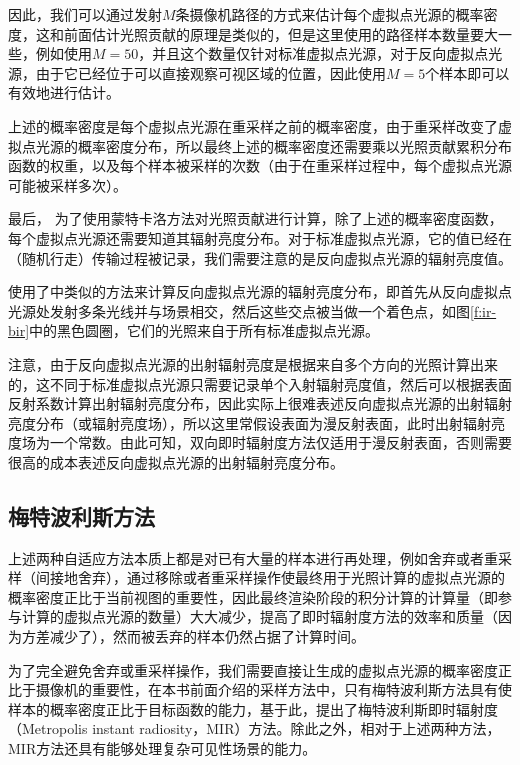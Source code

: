 因此，我们可以通过发射$M$条摄像机路径的方式来估计每个虚拟点光源的概率密度，这和前面估计光照贡献的原理是类似的，但是这里使用的路径样本数量要大一些，例如\cite{a:BidirectionalInstantRadiosity}使用$M=50$，并且这个数量仅针对标准虚拟点光源，对于反向虚拟点光源，由于它已经位于可以直接观察可视区域的位置，因此使用$M=5$个样本即可以有效地进行估计。

上述的概率密度是每个虚拟点光源在重采样之前的概率密度，由于重采样改变了虚拟点光源的概率密度分布，所以最终上述的概率密度还需要乘以光照贡献累积分布函数的权重，以及每个样本被采样的次数（由于在重采样过程中，每个虚拟点光源可能被采样多次）。

最后， 为了使用蒙特卡洛方法对光照贡献进行计算，除了上述的概率密度函数，每个虚拟点光源还需要知道其辐射亮度分布。对于标准虚拟点光源，它的值已经在（随机行走）传输过程被记录，我们需要注意的是反向虚拟点光源的辐射亮度值。

\cite{a:BidirectionalInstantRadiosity}使用了\cite{a:IlluminationinthePresenceofWeakSingularities}中类似的方法来计算反向虚拟点光源的辐射亮度分布，即首先从反向虚拟点光源处发射多条光线并与场景相交，然后这些交点被当做一个着色点，如图\ref{f:ir-bir}中的黑色圆圈，它们的光照来自于所有标准虚拟点光源。

注意，由于反向虚拟点光源的出射辐射亮度是根据来自多个方向的光照计算出来的，这不同于标准虚拟点光源只需要记录单个入射辐射亮度值，然后可以根据表面反射系数计算出射辐射亮度分布，因此实际上很难表述反向虚拟点光源的出射辐射亮度分布（或辐射亮度场），所以这里常假设表面为漫反射表面，此时出射辐射亮度场为一个常数。由此可知，双向即时辐射度方法仅适用于漫反射表面，否则需要很高的成本表述反向虚拟点光源的出射辐射亮度分布。




\subsection{梅特波利斯方法}\label{sec:ir-mir}
上述两种自适应方法本质上都是对已有大量的样本进行再处理，例如舍弃或者重采样（间接地舍弃），通过移除或者重采样操作使最终用于光照计算的虚拟点光源的概率密度正比于当前视图的重要性，因此最终渲染阶段的积分计算的计算量（即参与计算的虚拟点光源的数量）大大减少，提高了即时辐射度方法的效率和质量（因为方差减少了），然而被丢弃的样本仍然占据了计算时间。

为了完全避免舍弃或重采样操作，我们需要直接让生成的虚拟点光源的概率密度正比于摄像机的重要性，在本书前面介绍的采样方法中，只有梅特波利斯方法具有使样本的概率密度正比于目标函数的能力，基于此，\cite{a:MetropolisInstantRadiosity}提出了梅特波利斯即时辐射度（Metropolis instant radiosity，MIR）方法。除此之外，相对于上述两种方法，MIR方法还具有能够处理复杂可见性场景的能力。

